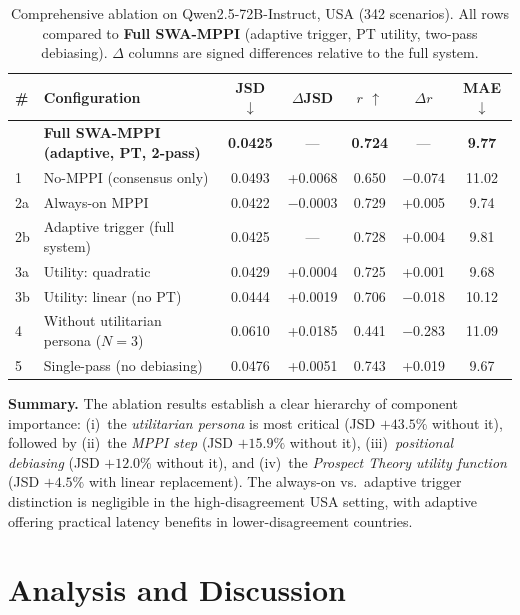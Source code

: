 \documentclass{article}
\newcommand{\gain}[1]{\textcolor{improvegreen}{#1}}
\newcommand{\loss}[1]{\textcolor{worsered}{#1}}
\begin{document}
\begin{table}[t]
\caption{Comprehensive ablation on Qwen2.5-72B-Instruct, USA (342 scenarios).
All rows compared to \textbf{Full SWA-MPPI} (adaptive trigger, PT utility, two-pass debiasing).
$\Delta$ columns are signed differences relative to the full system.}
\label{tab:ablation}
\centering
\setlength{\tabcolsep}{4pt}
\small
\begin{tabular}{llccccc}
\toprule
\# & Configuration & JSD $\downarrow$ & $\Delta$JSD & $r$ $\uparrow$ & $\Delta r$ & MAE $\downarrow$ \\
\midrule
  & \textbf{Full SWA-MPPI (adaptive, PT, 2-pass)} & \textbf{0.0425} & --- & \textbf{0.724} & --- & \textbf{9.77} \\
\midrule
1 & No-MPPI (consensus only)          & 0.0493 & \loss{+0.0068} & 0.650 & \loss{$-$0.074} & 11.02 \\
2a & Always-on MPPI                   & 0.0422 & \gain{$-$0.0003} & 0.729 & \gain{+0.005} & 9.74 \\
2b & Adaptive trigger (full system)   & 0.0425 & ---            & 0.728 & +0.004         & 9.81 \\
3a & Utility: quadratic               & 0.0429 & \loss{+0.0004} & 0.725 & +0.001         & 9.68 \\
3b & Utility: linear (no PT)          & 0.0444 & \loss{+0.0019} & 0.706 & \loss{$-$0.018} & 10.12 \\
4  & Without utilitarian persona ($N=3$) & 0.0610 & \loss{+0.0185} & 0.441 & \loss{$-$0.283} & 11.09 \\
5  & Single-pass (no debiasing)       & 0.0476 & \loss{+0.0051} & 0.743 & +0.019         & 9.67 \\
\bottomrule
\end{tabular}
\end{table}

\noindent\textbf{Summary.}
The ablation results establish a clear hierarchy of component importance:
(i)~the \emph{utilitarian persona} is most critical (JSD $+43.5\%$ without it),
followed by (ii)~the \emph{MPPI step} (JSD $+15.9\%$ without it),
(iii)~\emph{positional debiasing} (JSD $+12.0\%$ without it),
and (iv)~the \emph{Prospect Theory utility function} (JSD $+4.5\%$ with linear replacement).
The always-on vs.\ adaptive trigger distinction is negligible in the high-disagreement
USA setting, with adaptive offering practical latency benefits in lower-disagreement
countries.

\section{Analysis and Discussion}
\label{sec:analysis}
\end{document}

